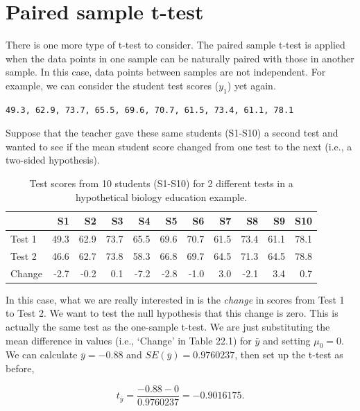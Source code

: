 \documentclass[
  openany]{scrbook}
\begin{document}
\hypertarget{paired-sample-t-test}{%
\section{Paired sample t-test}\label{paired-sample-t-test}}

There is one more type of t-test to consider.
The paired sample t-test is applied when the data points in one sample can be naturally paired with those in another sample.
In this case, data points between samples are not independent.
For example, we can consider the student test scores (\(y_{1}\)) yet again.

\begin{verbatim}
49.3, 62.9, 73.7, 65.5, 69.6, 70.7, 61.5, 73.4, 61.1, 78.1
\end{verbatim}

Suppose that the teacher gave these same students (S1-S10) a second test and wanted to see if the mean student score changed from one test to the next (i.e., a two-sided hypothesis).

\begin{table}

\caption{\label{tab:unnamed-chunk-83}Test scores from 10 students (S1-S10) for 2 different tests in a hypothetical biology education example.}
\centering
\begin{tabular}[t]{l|r|r|r|r|r|r|r|r|r|r}
\hline
  & S1 & S2 & S3 & S4 & S5 & S6 & S7 & S8 & S9 & S10\\
\hline
Test 1 & 49.3 & 62.9 & 73.7 & 65.5 & 69.6 & 70.7 & 61.5 & 73.4 & 61.1 & 78.1\\
\hline
Test 2 & 46.6 & 62.7 & 73.8 & 58.3 & 66.8 & 69.7 & 64.5 & 71.3 & 64.5 & 78.8\\
\hline
Change & -2.7 & -0.2 & 0.1 & -7.2 & -2.8 & -1.0 & 3.0 & -2.1 & 3.4 & 0.7\\
\hline
\end{tabular}
\end{table}

In this case, what we are really interested in is the \emph{change} in scores from Test 1 to Test 2.
We want to test the null hypothesis that this change is zero.
This is actually the same test as the one-sample t-test.
We are just substituting the mean difference in values (i.e., `Change' in Table 22.1) for \(\bar{y}\) and setting \(\mu_{0} = 0\).
We can calculate \(\bar{y} = -0.88\) and \(SE(\bar{y})=0.9760237\), then set up the t-test as before,

\[t_{\bar{y}} = \frac{-0.88 - 0}{0.9760237} = -0.9016175.\]
\end{document}
